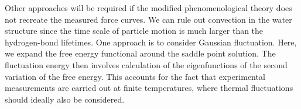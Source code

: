 Other approaches will be required if the modified phenomenological theory 
does not recreate the measured force curves.
We can rule out convection in the water structure since  
the time scale of particle motion is much larger than
the hydrogen-bond lifetimes. One approach is to consider Gaussian fluctuation.
Here, we expand the free energy functional around the saddle point solution.
The fluctuation energy then involves calculation of the eigenfunctions of
the second variation of the free energy. This accounts for the fact
that experimental measurements are carried out at finite 
temperatures, where thermal fluctuations should ideally also be considered. 

%
%
%

